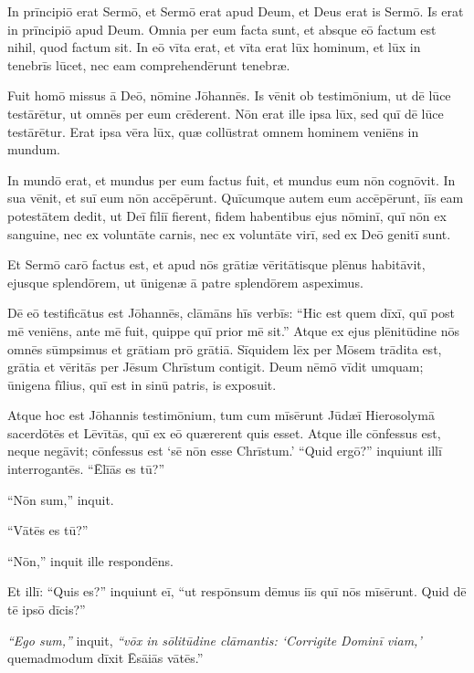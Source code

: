 
\Caput
\Versus In prīncipiō erat Sermō, et Sermō erat apud Deum, et Deus erat is Sermō.
\Versus Is erat in prīncipiō apud Deum.
\Versus Omnia per eum facta sunt, et absque eō factum est nihil, quod factum sit.
\Versus In eō vīta erat, et vīta erat lūx hominum,
\Versus et lūx in tenebrīs lūcet, nec eam comprehendērunt tenebræ.

\Versus Fuit homō missus ā Deō, nōmine Jōhannēs.
\Versus Is vēnit ob testimōnium, ut dē lūce testārētur, ut omnēs per eum crēderent.
\Versus Nōn erat ille ipsa lūx, sed quī dē lūce testārētur.
\Versus Erat ipsa vēra lūx, quæ collūstrat omnem hominem veniēns in mundum.

\Versus In mundō erat, et mundus per eum factus fuit, et mundus eum nōn cognōvit.
\Versus In sua vēnit, et suī eum nōn accēpērunt.
\Versus Quīcumque autem eum accēpērunt, iīs eam potestātem dedit, ut Deī fīliī fierent, fidem habentibus ejus nōminī,
\Versus quī nōn ex sanguine, nec ex voluntāte carnis, nec ex voluntāte virī, sed ex Deō genitī sunt.

\Versus Et Sermō carō factus est, et apud nōs grātiæ vēritātisque plēnus habitāvit, ejusque splendōrem, ut ūnigenæ ā patre splendōrem aspeximus.

\Versus Dē eō testificātus est Jōhannēs, clāmāns hīs verbīs: ``Hic est quem dīxī, quī post mē veniēns, ante mē fuit, quippe quī prior mē sit.''
\Versus Atque ex ejus plēnitūdine nōs omnēs sūmpsimus et grātiam prō grātiā.
\Versus Sīquidem lēx per Mōsem trādita est, grātia et vēritās per Jēsum Chrīstum contigit.
\Versus Deum nēmō vīdit umquam; ūnigena fīlius, quī est in sinū patris, is exposuit.

\Versus Atque hoc est Jōhannis testimōnium, tum cum mīsērunt Jūdæī Hierosolymā sacerdōtēs et Lēvītās, quī ex eō quærerent quis esset.
\Versus Atque ille cōnfessus est, neque negāvit; cōnfessus est `sē nōn esse Chrīstum.'
\Versus ``Quid ergō?'' inquiunt illī interrogantēs. ``Ēlīās es tū?''

``Nōn sum,'' inquit.

``Vātēs es tū?''

``Nōn,'' inquit ille respondēns.

\Versus Et illī: ``Quis es?'' inquiunt eī, ``ut respōnsum dēmus iīs quī nōs mīsērunt. Quid dē tē ipsō dīcis?''

\Versus \emph{``Ego sum,''} inquit, \emph{``vōx in sōlitūdine clāmantis: `Corrigite Dominī viam,'} quemadmodum dīxit Ēsāiās vātēs.''


